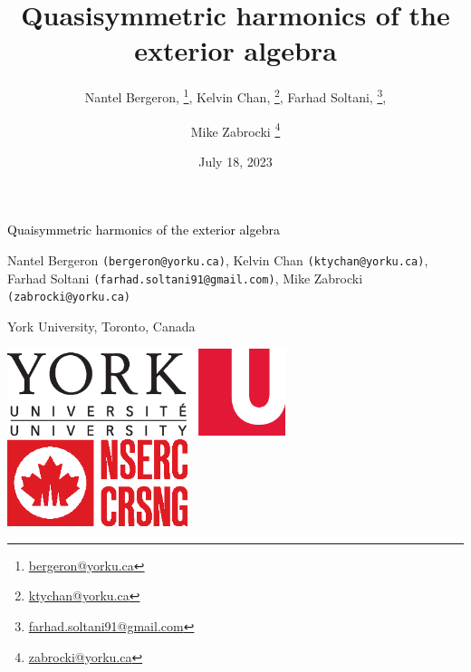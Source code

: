\documentclass[a0,landscape]{a0poster}
\title{Quasisymmetric harmonics of the exterior algebra}
\author{
  Nantel Bergeron, \thanks{\href{mailto:bergeron@yorku.ca}{bergeron@yorku.ca}}, 
  Kelvin Chan, \thanks{\href{mailto:ktychan@yorku.ca}{ktychan@yorku.ca}},
  Farhad Soltani, \thanks{\href{mailto:farhad.soltani91@gmail.com}{farhad.soltani91@gmail.com}}, \and
  Mike Zabrocki \thanks{\href{mailto:zabrocki@yorku.ca}{zabrocki@yorku.ca}}
}
\date{July 18, 2023}
\newcommand{\email}[1]{\texttt{\footnotesize (#1)}}
\begin{document}
%
%
\begin{mdframed}[backgroundcolor=teal!5, hidealllines=true]
  \hspace{.1\textwidth}
  \begin{minipage}{.7\textwidth}
    {\veryHuge \textcolor{black}{Quaisymmetric harmonics of the exterior algebra} \quad
     }
    \medskip

    {Nantel Bergeron \email{bergeron@yorku.ca}, Kelvin Chan \email{\footnotesize ktychan@yorku.ca}, Farhad Soltani \email{farhad.soltani91@gmail.com}, Mike Zabrocki \email{zabrocki@yorku.ca}} 

    {York University, Toronto, Canada} 
  \end{minipage}
  \quad
  \quad
  \begin{minipage}{.2\textwidth}
    \includegraphics[height=1in]{logo_york.eps} \hspace{2em}
    \includegraphics[height=1in]{logo_nserc.eps}\hspace{2em}
  \end{minipage}
\end{mdframed}
\end{document}
